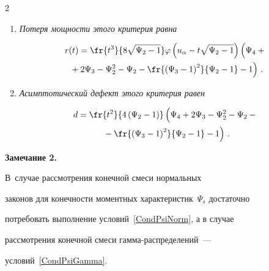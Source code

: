 \begin{multicols}{2}
\begin{enumerate}
\begin{equation*}
\beta^*(t)=\Phi(t\sqrt{\Psi_2-1}-u_\alpha)\,.

\end{equation*}

\item \textit{Потеря мощности этого критерия равна}

\begin{multline*}

r(t)=\fr{t^3}{8\sqrt{\Psi_2-1}}\varphi\left(u_\alpha-t\sqrt{\Psi_2-1}\right)

\left(\vphantom{\fr{\left(\Psi_3-1\right)^2}{\Psi_2-1}-1}\Psi_4+{}\right.\\

\left.{}+2\Psi_3-\Psi^2_2-\Psi_2-\fr{\left(\Psi_3-1\right)^2}{\Psi_2-1}-1\right)\,.

\end{multline*}

\item \textit{Асимптотический дефект этого критерия равен}

\begin{multline*}

d=\fr{t^2}{4\left(\Psi_2-1\right)}

\left(\vphantom{\fr{\left(\Psi_3-1\right)^2}{\Psi_2-1}}

\Psi_4+2\Psi_3-\Psi^2_2-\Psi_2-{}\right.\\

\left.{}-\fr{\left(\Psi_3-1\right)^2}{\Psi_2-1}-1\right)\,.

\end{multline*}

\end{enumerate}








\noindent

\textbf{Замечание 2.}

В~случае рассмотрения конечной смеси нормальных

законов для конечности моментных характеристик~$\Psi_s$ достаточно

потребовать выполнение условий~\eqref{CondPsiNorm}, а в случае

рассмотрения конечной смеси гам\-ма-рас\-пре\-де\-ле\-ний~---

условий~\eqref{CondPsiGamma}.



\medskip




\end{multicols}
